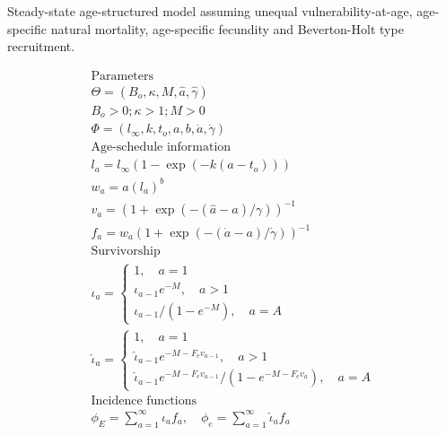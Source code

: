  

\begin{table}[!tbp]
\caption{Steady-state age-structured model assuming unequal
vulnerability-at-age, age-specific natural mortality, age-specific
fecundity and Beverton-Holt type recruitment.}\label{Table2} 
\tableEq
    \begin{gather}
           \hline
        \mbox{Parameters} \nonumber \\
            \Theta = (B_o,\kappa,M,\hat{a},\hat{\gamma}) \label{T2.1}\\
            B_o>0; \kappa > 1; M > 0\\
            \Phi = (l_\infty, k, t_o,a,b,\dot{a},\dot{\gamma}) \label{T2.3}\\[1ex]
        \mbox{Age-schedule information} \nonumber\\
            l_a=l_\infty(1-\exp(-k(a-t_o)))\label{T2.4}\\
            w_a=a(l_a)^b \label{T2.5}\\
            v_a=(1+\exp(-(\hat{a}-a)/\gamma))^{-1} \label{T2.6}\\
            f_a=w_a(1+\exp(-(\dot{a}-a)/\dot{\gamma}))^{-1} \label{T2.7}\\[1ex]
        \mbox{Survivorship} \nonumber\\
            \iota_a=\begin{cases} 1, \quad a=1      \label{T2.8} \\
            \iota_{a-1}e^{-M},\quad a>1\\
            \iota_{a-1}/(1-e^{-M}),\quad a=A \end{cases}\\
            \hat{\iota}_a=\begin{cases} 1, \quad a=1\\
            \hat{\iota}_{a-1}e^{-M-F_e v_{a-1}},\quad a>1\\
            \hat{\iota}_{a-1}e^{-M-F_e v_{a-1}}/(1-e^{-M-F_e v_{a}}),\quad a=A
            \end{cases} \label{T2.9}\\[1ex]
        \mbox{Incidence functions} \nonumber \\
            \phi_E=\sum_{a=1}^\infty \iota_a f_a, \quad
            \phi_e=\sum_{a=1}^\infty \hat{\iota}_a f_a \label{T2.10}\\

\end{gather}
\end{table}
